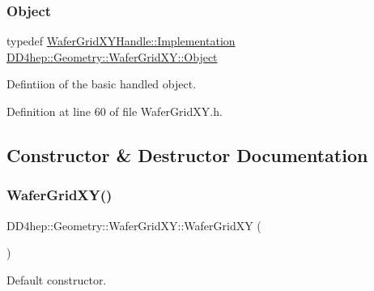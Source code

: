 \subsubsection{\texorpdfstring{Object}{Object}}
{\footnotesize\ttfamily typedef \hyperlink{class_d_d4hep_1_1_handle_ad7ff728a25806079516b8965b9113f1a}{Wafer\+Grid\+X\+Y\+Handle\+::\+Implementation} \hyperlink{class_d_d4hep_1_1_geometry_1_1_wafer_grid_x_y_a94a234312cc2c123569319d3d33b24e0}{D\+D4hep\+::\+Geometry\+::\+Wafer\+Grid\+X\+Y\+::\+Object}}



Defintiion of the basic handled object. 



Definition at line 60 of file Wafer\+Grid\+X\+Y.\+h.



\subsection{Constructor \& Destructor Documentation}
\hypertarget{class_d_d4hep_1_1_geometry_1_1_wafer_grid_x_y_a670a1a3bd33455d9673aad2aa3d405a7}{}\label{class_d_d4hep_1_1_geometry_1_1_wafer_grid_x_y_a670a1a3bd33455d9673aad2aa3d405a7} 
\subsubsection{\texorpdfstring{Wafer\+Grid\+X\+Y()}{WaferGridXY()}\hspace{0.1cm}{\footnotesize\ttfamily [1/5]}}
{\footnotesize\ttfamily D\+D4hep\+::\+Geometry\+::\+Wafer\+Grid\+X\+Y\+::\+Wafer\+Grid\+XY (\begin{DoxyParamCaption}{ }\end{DoxyParamCaption})\hspace{0.3cm}{\ttfamily [default]}}



Default constructor. 

\hypertarget{class_d_d4hep_1_1_geometry_1_1_wafer_grid_x_y_afc1372a29ee56d9776941a3da2ad0c87}{}\label{class_d_d4hep_1_1_geometry_1_1_wafer_grid_x_y_afc1372a29ee56d9776941a3da2ad0c87} 
